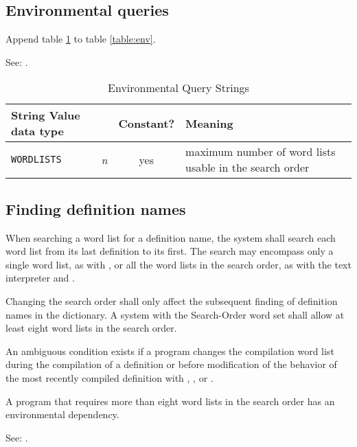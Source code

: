 \subsection{Environmental queries} %

Append table \ref{search:env} to table \ref{table:env}.

See: .

\begin{table}[ht]
  \begin{center}
	\caption{Environmental Query Strings}
	\label{search:env}
	\begin{tabular}{p{10em}rcp{}}
		\hline\hline
		\multicolumn{2}{l}{String \hfill Value data type} & Constant? & Meaning \\
		\hline
		\texttt{WORDLISTS}			& \emph{n}		& yes	&
			maximum number of word lists usable in the search order\\
		\hline\hline
	\end{tabular}
  \end{center}
\end{table}

\subsection{Finding definition names} %
\label{search:find}

When searching a word list for a definition name, the system shall
search each word list from its last definition to its first. The
search may encompass only a single word list, as with
, or all the word lists in the search order,
as with the text interpreter and .

Changing the search order shall only affect the subsequent finding
of definition names in the dictionary. A system with the Search-Order
word set shall allow at least eight word lists in the search order.

An ambiguous condition exists if a program changes the compilation
word list during the compilation of a definition or before
modification of the behavior of the most recently compiled definition
with , , or
.

A program that requires more than eight word lists in the search
order has an environmental dependency.

See: .


